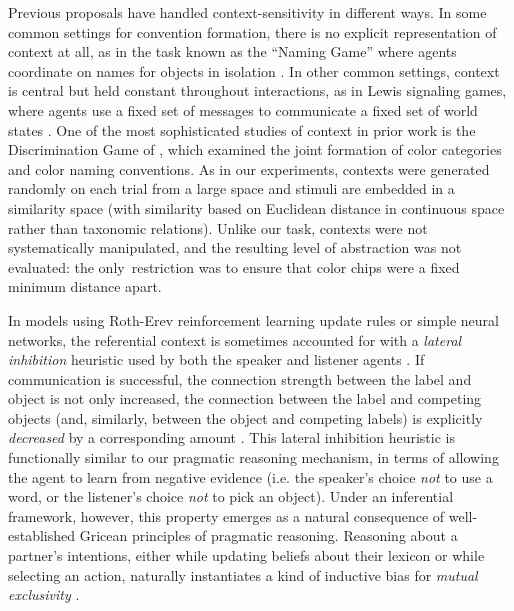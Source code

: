 Previous proposals have handled context-sensitivity in different ways.
In some common settings for convention formation, there is no explicit representation of context at all, as in the task known as the ``Naming Game'' where agents coordinate on names for objects in isolation \cite{Baronchelli,oldnaminggame}. 
In other common settings, context is central but held constant throughout interactions, as in Lewis signaling games, where agents use a fixed set of messages to communicate a fixed set of world states \cite{lewis,signalinggame}.
One of the most sophisticated studies of context in prior work is the Discrimination Game of , which examined the joint formation of color categories and color naming conventions.
As in our experiments, contexts were generated randomly on each trial from a large space and stimuli are embedded in a similarity space (with similarity based on Euclidean distance in continuous space rather than taxonomic relations).
Unlike our task, contexts were not systematically manipulated, and the resulting level of abstraction was not evaluated: the only restriction was to ensure that color chips were a fixed minimum distance apart.

In models using Roth-Erev reinforcement learning update rules or simple neural networks, the referential context is sometimes accounted for with a \emph{lateral inhibition} heuristic used by both the speaker and listener agents \cite{franke2012bidirectional}.
If communication is successful, the connection strength between the label and object is not only increased, the connection between the label and competing objects (and, similarly, between the object and competing labels) is explicitly \emph{decreased} by a corresponding amount \cite<see also>{steels2005coordinating}.
This lateral inhibition heuristic is functionally similar to our pragmatic reasoning mechanism, in terms of allowing the agent to learn from negative evidence (i.e. the speaker's choice \emph{not} to use a word, or the listener's choice \emph{not} to pick an object). 
Under an inferential framework, however, this property emerges as a natural consequence of well-established Gricean principles of pragmatic reasoning.
Reasoning about a partner's intentions, either while updating beliefs about their lexicon or while selecting an action, naturally instantiates a kind of inductive bias for \emph{mutual exclusivity} \cite{gulordava2020one,ohmerreinforcement,FrankGoodmanTenenbaum09_Wurwur}.

